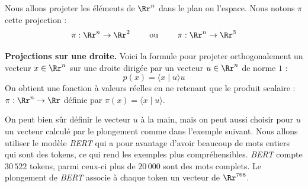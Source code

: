 \documentclass[11pt,class=report,crop=false]{standalone}
\begin{document}
Nous allons projeter les éléments de $\Rr^n$ dans le plan ou l'espace.
Nous notons $\pi$ cette projection :
$$\pi : \Rr^n \to \Rr^2 \qquad \text{ ou } \qquad \pi : \Rr^n \to \Rr^3$$




\bigskip

\textbf{Projections sur une droite.}
Voici la formule pour projeter orthogonalement un vecteur $x \in \Rr^n$ sur une droite dirigée par un vecteur $u \in \Rr^n$ de norme $1$ :
$$p(x) = \langle x \mid u \rangle u$$
On obtient une fonction à valeurs réelles en ne retenant que le produit scalaire : $\pi : \Rr^n \to \Rr$ définie par $\pi(x) = \langle x \mid u \rangle$.


On peut bien sûr définir le vecteur $u$ à la main, mais on peut aussi choisir pour $u$ un vecteur calculé par le plongement comme dans l'exemple suivant.
Nous allons utiliser le modèle \emph{BERT} qui a pour avantage d'avoir beaucoup de mots entiers qui sont des tokens, ce qui rend les exemples plus compréhensibles. \emph{BERT} compte $30\,522$ tokens, parmi ceux-ci plus de $20\,000$ sont des mots complets. Le plongement de \emph{BERT} associe à chaque token un vecteur de $\Rr^{768}$.
\end{document}

